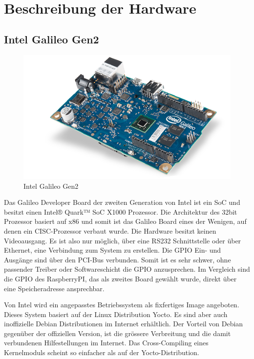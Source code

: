 \section{Beschreibung der Hardware}
\label{beschreibung_hardware}
\subsection{Intel Galileo Gen2}

\begin{figure}
\centering
\includegraphics[scale=0.5]{images/iot_galileo.png}
\caption{Intel Galileo Gen2\cite{intel_galileo_image}}
\label{fig:Intel Galileo Gen2}
\end{figure}

Das Galileo Developer Board\cite{intel_datasheet_galileo} der zweiten Generation von
Intel ist ein SoC und besitzt einen Intel® Quark™ SoC X1000 Prozessor. Die Architektur des 32bit Prozessor basiert auf x86\cite{intel_datasheet} und somit ist das Galileo
Board eines der Wenigen, auf denen ein CISC-Prozessor verbaut wurde. Die Hardware
besitzt keinen Videoausgang. Es ist also nur möglich, über eine RS232 Schnittstelle oder über Ethernet,
eine Verbindung zum System zu erstellen. Die GPIO Ein- und Ausgänge sind über den
PCI-Bus verbunden. Somit ist es sehr schwer, ohne passender Treiber oder
Softwareschicht die GPIO anzusprechen. Im Vergleich sind die GPIO des RaspberryPI, das als zweites Board gewählt wurde,
direkt über eine Speicheradresse ansprechbar.
\par
Von Intel wird ein angepasstes Betriebssystem als fixfertiges Image angeboten. Dieses System basiert auf
der Linux Distribution Yocto. Es sind aber auch inoffizielle Debian Distributionen im
Internet erhältlich. Der Vorteil von Debian gegenüber der offiziellen Version, ist die
grössere Verbreitung und die damit verbundenen Hilfestellungen im Internet. Das Cross-Compiling eines Kernelmoduls scheint so einfacher als auf der Yocto-Distribution.


